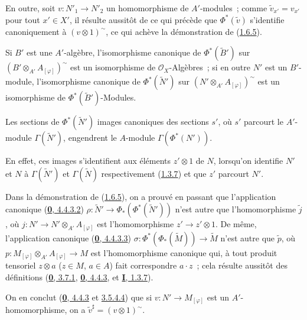 En outre, soit $v:N'_1\to N'_2$ un homomorphisme de $A'$-modules~; comme
$\widetilde{v}_{x'}=v_{x'}$ pour tout $x'\in X'$, il résulte aussitôt de ce
qui précède que $\Phi^*(\widetilde{v})$ s'identifie canoniquement à
$(v\otimes 1)^{\sim}$, ce qui achève la démonstration de
(\hyperref[I.1.6.5-fr]{1.6.5}).

Si $B'$ est une $A'$-algèbre, l'isomorphisme canonique de
$\Phi^*(\widetilde{B}')$ sur
$(B'\otimes_{A'}A_{[\varphi]})^{\sim}$ est un isomorphisme de
$\mathscr{O}_X$-Algèbres~; si en outre $N'$ est un $B'$-module,
l'isomorphisme canonique de $\Phi^*(\widetilde{N}')$ sur
$(N'\otimes_{A'}A_{[\varphi]})^{\sim}$ est un isomorphisme de
$\Phi^*(\widetilde{B}')$-Modules.

\begin{corollary}[1.6.6]
\label{I.1.6.6-fr}
Les sections de $\Phi^*(\widetilde{N}')$ images canoniques des sections $s'$,
où $s'$ parcourt le $A'$-module $\Gamma(\widetilde{N}')$, engendrent le
$A$-module $\Gamma(\Phi^*(N'))$.
\end{corollary}

En effet, ces images s'identifient aux éléments $z'\otimes 1$ de $N$,
lorsqu'on identifie $N'$ et $N$ à $\Gamma(\widetilde{N}')$ et
$\Gamma(\widetilde{N})$ respectivement (\hyperref[I.1.3.7-fr]{1.3.7}) et
que $z'$ parcourt $N'$.

\begin{env}[1.6.7]
\label{I.1.6.7-fr}
Dans la démonstration de (\hyperref[I.1.6.5-fr]{1.6.5}), on a prouvé en
passant que l'application canonique
(\hyperref[0.4.4.3.2-fr]{\textbf{0}, 4.4.3.2})
$\rho:\widetilde{N}'\to\Phi_*(\Phi^*(\widetilde{N}'))$ n'est autre que
l'homomorphisme $\widetilde{j}$,
où $j:N'\to N'\otimes_{A'}A_{[\varphi]}$ est l'homomorphisme
$z'\to z'\otimes 1$. De même, l'application canonique
(\hyperref[0.4.4.3.3-fr]{\textbf{0}, 4.4.3.3})
$\sigma:\Phi^*(\Phi_*(\widetilde{M}))\to\widetilde{M}$ n'est autre que
$\widetilde{p}$, où
$p:M_{[\varphi]}\otimes_{A'}A_{[\varphi]}\to M$ est l'homomorphisme
canonique qui, à tout produit tensoriel $z\otimes a$ ($z\in M$, $a\in A$)
fait correspondre $a\cdot z$~; cela résulte aussitôt des définitions
(\hyperref[0.3.7.1-fr]{\textbf{0}, 3.7.1},
\hyperref[0.4.4.3-fr]{\textbf{0}, 4.4.3}, et
\hyperref[I.1.3.7-fr]{\textbf{I}, 1.3.7}).

On en conclut (\hyperref[0.4.4.3-fr]{\textbf{0}, 4.4.3} et
\hyperref[0.3.5.4.4-fr]{3.5.4.4}) que si
$v:N'\to M_{[\varphi]}$ est un $A'$-homomorphisme, on a
$\widetilde{v}^{\sharp}=(v\otimes 1)^{\sim}$.
\end{env}

